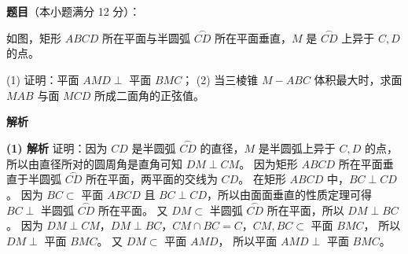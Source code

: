 \begin{answer}

\textbf{题目}（本小题满分 12 分）：

如图，矩形 $ABCD$ 所在平面与半圆弧 $\overset{\frown}{CD}$ 所在平面垂直，$M$ 是 $\overset{\frown}{CD}$ 上异于 $C, D$ 的点。
\nopagebreak[4]
\begin{center}\end{center}
\nopagebreak[4]
(1) 证明：平面 $AMD \perp$ 平面 $BMC$；
(2) 当三棱锥 $M - ABC$ 体积最大时，求面 $MAB$ 与面 $MCD$ 所成二面角的正弦值。

\textbf{解析}

\textbf{(1) 解析} 证明：因为 $CD$ 是半圆弧 $\overset{\frown}{CD}$ 的直径，$M$ 是半圆弧上异于 $C, D$ 的点，
所以由直径所对的圆周角是直角可知 $DM \perp CM$。
因为矩形 $ABCD$ 所在平面垂直于半圆弧 $\overset{\frown}{CD}$ 所在平面，两平面的交线为 $CD$。
在矩形 $ABCD$ 中，$BC \perp CD$。
因为 $BC \subset$ 平面 $ABCD$ 且 $BC \perp CD$，所以由面面垂直的性质定理可得 $BC \perp$ 半圆弧 $\overset{\frown}{CD}$ 所在平面。
又 $DM \subset$ 半圆弧 $\overset{\frown}{CD}$ 所在平面，所以 $DM \perp BC$。
因为 $DM \perp CM$，$DM \perp BC$，$CM \cap BC = C$，$CM, BC \subset$ 平面 $BMC$，
所以 $DM \perp$ 平面 $BMC$。
又 $DM \subset$ 平面 $AMD$，
所以平面 $AMD \perp$ 平面 $BMC$。


\end{answer}
